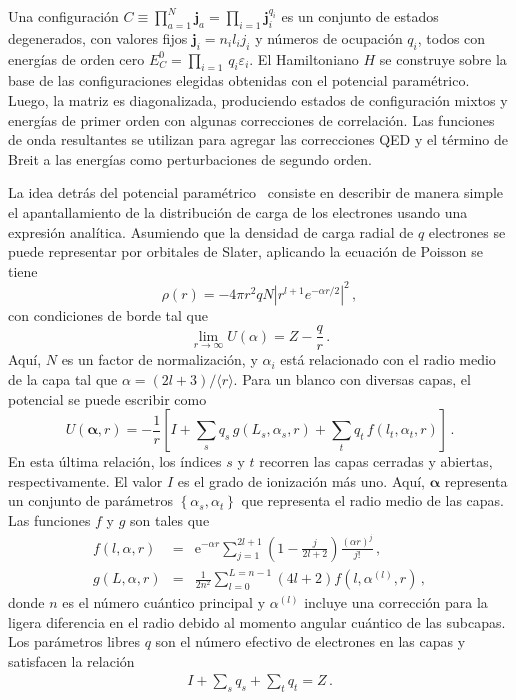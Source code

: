 Una configuración 
$C\equiv\prod_{a=1}^N\mathbf{j}_a=\prod_{i=1}\mathbf{j}_i^{q_i}$ es un 
conjunto de estados degenerados, con valores fijos 
$\mathbf{j}_i=n_il_ij_i$
y números de ocupación $q_i$, todos con energías de orden cero 
$E_C^0=\prod_{i=1}\,q_i\varepsilon_i$. 
El Hamiltoniano $H$ se construye sobre la base de las configuraciones 
elegidas obtenidas con el potencial paramétrico. Luego, la matriz es 
diagonalizada, produciendo estados de configuración mixtos y energías 
de primer orden con algunas correcciones de correlación. Las funciones 
de onda resultantes se utilizan para agregar las correcciones QED y el 
término de Breit a las energías como perturbaciones de segundo orden.

La idea detrás del potencial paramétrico~\cite{Klapisch:77} consiste en
describir de manera simple el apantallamiento de la distribución de 
carga de los electrones usando una expresión analítica. Asumiendo que 
la densidad de carga radial de $q$ electrones se puede representar por 
orbitales de Slater, aplicando la ecuación de Poisson se tiene
\begin{equation}
\rho(r) = -4\pi r^2 qN\left|r^{l+1}e^{-\alpha r/2}\right|^2\,,
\end{equation} 
con condiciones de borde tal que
\begin{equation}
\lim_{r\rightarrow\infty} U(\alpha)=Z-\frac{q}{r}\,.
\end{equation} 
Aquí, $N$ es un factor de normalización, y $\alpha_i$ está relacionado 
con el radio medio de la capa tal que $\alpha=(2l+3)/\langle r\rangle$. 
Para un blanco con diversas capas, el potencial se puede escribir como
\begin{equation}
U(\boldsymbol{\alpha},r)=-\frac{1}{r} \left[I+\sum_s q_s\, g(L_s,\alpha_s,r) 
+ \sum_t q_t\,f(l_t,\alpha_t,r)\right]\,.
\label{eq:potparam}
\end{equation}
En esta última relación, los índices $s$ y $t$ recorren las capas 
cerradas y abiertas, respectivamente. El valor $I$ es el grado de 
ionización más uno. 
Aquí, $\boldsymbol{\alpha}$ representa un conjunto de parámetros 
$\left\{\alpha_s,\alpha_t\right\}$ que representa el radio medio de las 
capas. Las funciones $f$ y $g$ son tales que
\begin{eqnarray}
f(l,\alpha,r)&=&\mathrm{e}^{-\alpha r}\sum_{j=1}^{2l+1}
\left(1-\frac{j}{2l+2}\right)\frac{(\alpha r)^j}{j!}\,,\\
g(L,\alpha,r)&=&\frac{1}{2n^2}\sum_{l=0}^{L=n-1}
(4l+2)f\left(l,\alpha^{(l)},r\right)\,,
\end{eqnarray}
donde $n$ es el número cuántico principal y $\alpha^{(l)}$ incluye una
corrección para la ligera diferencia en el radio debido al momento 
angular cuántico de las subcapas. Los parámetros libres $q$ son el 
número efectivo de electrones en las capas y satisfacen la relación 
\begin{eqnarray}
I+\sum_s q_s+\sum_t q_t=Z\,.
\end{eqnarray}

